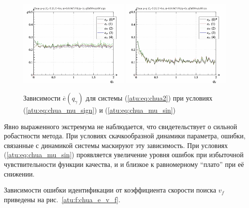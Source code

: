 \begin{figure}[htb!]
  \centerline{
    \includegraphics[width=0.49\textwidth]{p/cha/chua/ql3rlWvnAAW/chua_id-p_q_gamma_sign.png}
    \hfill
    \includegraphics[width=0.49\textwidth]{p/cha/chua/ql3rlWvnAAW/chua_id-p_q_gamma_sin.png}
  }
  \caption{Зависимости  $\overline{e}(q_\gamma)$ для системы (\ref{atu:eq:chua2})
  при условиях (\ref{atu:eq:chua_mu_sign}) и (\ref{atu:eq:chua_mu_sin})
}
\label{atu:f:chua_e_qgamma}
\end{figure}

Явно выраженного экстремума не наблюдается, что свидетельствует
о сильной робастности метода. При условиях скачкообразной
динамики параметра, ошибки, связанные с динамикой системы
маскируют эту зависимость. При условиях (\ref{atu:eq:chua_mu_sin})
проявляется увеличение уровня ошибок при избыточной чувствительности функции
качества, и и близкое к равномерному ``плато'' при её снижении.

Зависимости ошибки идентификации от коэффициента скорости поиска $v_f$
приведены на рис.~\ref{atu:f:chua_e_v_f}.

